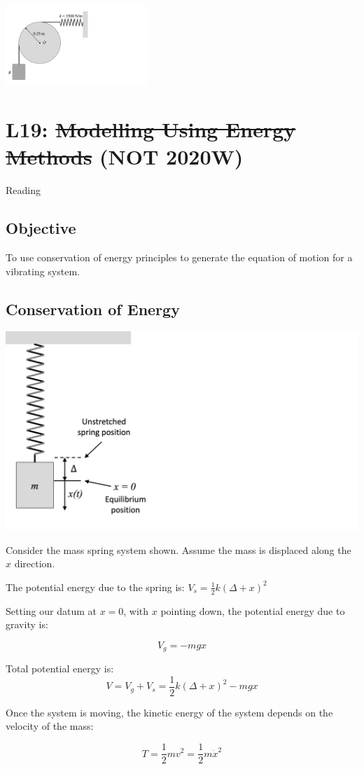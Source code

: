 \documentclass[12pt,letterpaper,twoside]{report}
\begin{document}
\includegraphics[trim={0cm 0cm 14cm 1cm},clip,width=0.4\textwidth, left]{Slide80}

\chapter{L19: \sout{Modelling Using Energy Methods} (NOT 2020W)}
Reading

\section{Objective}
To use conservation of energy principles to generate the equation of motion for a vibrating system.  

\section{Conservation of Energy}

\begin{minipage}{0.35\textwidth}
\includegraphics[trim={0cm 0cm 20cm 0cm},clip,width=1\textwidth, left]{Slide117}
\end{minipage}
\begin{minipage}{0.65\textwidth}
Consider the mass spring system shown.  Assume the mass is displaced along the $x$ direction. 

The potential energy due to the spring is:  $V_s = \frac{1}{2}k(\Delta + x)^2$

Setting our datum at $x=0$, with $x$ pointing down, the potential energy due to gravity is: 

\[V_g = -mgx\]

Total potential energy is:
\[
V = V_g + V_s = \frac{1}{2} k (\Delta + x)^2 - mgx
\]

Once the system is moving, the kinetic energy of the system depends on the velocity of the mass:

\[
T = \frac{1}{2}mv^2 = \frac{1}{2}m \dot{x}^2
\]
\end{minipage}
\end{document}
